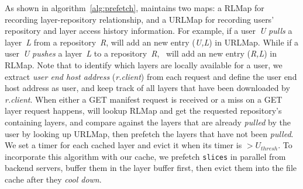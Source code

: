 
As shown in algorithm~\ref{alg:prefetch}, \sysname maintains two maps: a RLMap for recording layer-repository
relationship, and 
a URLMap for recording 
users' repository and layer access history information. 
For example, if a user~\emph{U} \emph{pulls} a layer~\emph{L} from a repository~\emph{R},
\sysname will add an new entry (\emph{U,L}) in URLMap.
While if a user~\emph{U} \emph{pushes} a  layer~\emph{L} to a repository~\emph{R},
\sysname~will add an new entry (\emph{R,L}) in RLMap. 
Note that to identify which layers are locally available for a user, 
we extract \emph{user end host address} (\emph{r.client}) 
from each request and define the user end host address as user,
and keep track of all layers that have been downloaded by \emph{r.client}. 
When either a GET manifest request is received or 
a miss on a GET layer request happens,
\sysname will lookup RLMap and get the requested repository's containing layers,
and compare against the layers that are already \emph{pulled} by the user by looking up URLMap,
then prefetch the layers that have not been \emph{pulled}. 
We set a timer for each cached layer and evict it when its timer is $>U_{thresh}$.
To incorporate this algorithm with our cache,
we prefetch \texttt{slices} in parallel from backend servers,  
buffer them in the layer buffer first, then evict them into the file cache after they \emph{cool down}.

 

